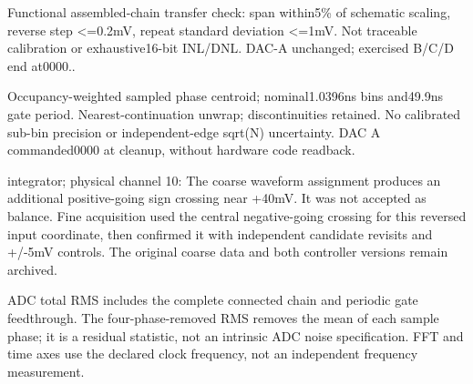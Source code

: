 Functi\allowbreak{}onal assemb\allowbreak{}led-\allowbreak{}chain transf\allowbreak{}er check: span within\allowbreak{}5\% of schema\allowbreak{}tic scalin\allowbreak{}g,\allowbreak{} revers\allowbreak{}e step <=0.2mV,\allowbreak{} repeat\allowbreak{} standa\allowbreak{}rd deviat\allowbreak{}ion <=1mV. Not tracea\allowbreak{}ble calibr\allowbreak{}ation or exhaus\allowbreak{}tive16\allowbreak{}-\allowbreak{}bit INL/\allowbreak{}DNL. DAC-\allowbreak{}A unchan\allowbreak{}ged; exerci\allowbreak{}sed B/\allowbreak{}C/\allowbreak{}D end at0000\allowbreak{}..

Occupa\allowbreak{}ncy-\allowbreak{}weight\allowbreak{}ed sample\allowbreak{}d phase centro\allowbreak{}id; nomina\allowbreak{}l1.0396ns\allowbreak{} bins and49.9ns gate period\allowbreak{}. Neares\allowbreak{}t-\allowbreak{}contin\allowbreak{}uation\allowbreak{} unwrap\allowbreak{}; discon\allowbreak{}tinuit\allowbreak{}ies retain\allowbreak{}ed. No calibr\allowbreak{}ated sub-\allowbreak{}bin precis\allowbreak{}ion or indepe\allowbreak{}ndent-\allowbreak{}edge sqrt(N) uncert\allowbreak{}ainty. DAC A comman\allowbreak{}ded000\allowbreak{}0 at cleanu\allowbreak{}p,\allowbreak{} withou\allowbreak{}t hardwa\allowbreak{}re code readba\allowbreak{}ck.

integr\allowbreak{}ator; physic\allowbreak{}al channe\allowbreak{}l 10: The coarse\allowbreak{} wavefo\allowbreak{}rm assign\allowbreak{}ment produc\allowbreak{}es an additi\allowbreak{}onal positi\allowbreak{}ve-\allowbreak{}going sign crossi\allowbreak{}ng near +40mV. It was not accept\allowbreak{}ed as balanc\allowbreak{}e. Fine acquis\allowbreak{}ition used the centra\allowbreak{}l negati\allowbreak{}ve-\allowbreak{}going crossi\allowbreak{}ng for this revers\allowbreak{}ed input coordi\allowbreak{}nate,\allowbreak{} then confir\allowbreak{}med it with indepe\allowbreak{}ndent candid\allowbreak{}ate revisi\allowbreak{}ts and +/\allowbreak{}-\allowbreak{}5mV contro\allowbreak{}ls. The origin\allowbreak{}al coarse\allowbreak{} data and both contro\allowbreak{}ller versio\allowbreak{}ns remain\allowbreak{} archiv\allowbreak{}ed.

ADC total RMS includes the complete connected chain and periodic gate feedthrough. The four-phase-removed RMS removes the mean of each sample phase; it is a residual statistic, not an intrinsic ADC noise specification. FFT and time axes use the declared clock frequency, not an independent frequency measurement.

